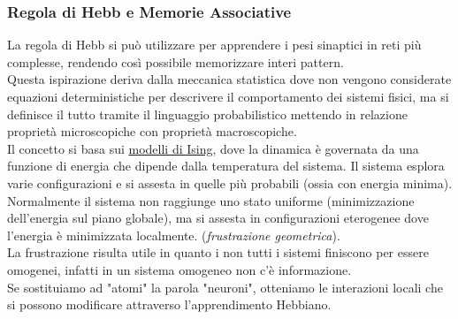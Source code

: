 \documentclass[12pt, a4paper]{article}
\begin{document}
\subsubsection{Regola di Hebb e Memorie Associative}
La regola di Hebb si può utilizzare per apprendere i pesi sinaptici in reti più complesse, rendendo così possibile memorizzare interi pattern. \\
Questa ispirazione deriva dalla meccanica statistica dove non vengono considerate equazioni deterministiche per descrivere il comportamento dei sistemi fisici, ma si definisce il tutto tramite il linguaggio probabilistico mettendo in relazione proprietà microscopiche con proprietà macroscopiche. \\
Il concetto si basa sui \href{https://it.wikipedia.org/wiki/Modello_di_Ising}{modelli di Ising}, dove la dinamica è governata da una funzione di energia che dipende dalla temperatura del sistema. Il sistema esplora varie configurazioni e si assesta in quelle più probabili (ossia con energia minima). Normalmente il sistema non raggiunge uno stato uniforme (minimizzazione dell'energia sul piano globale), ma si assesta in configurazioni eterogenee dove l'energia è minimizzata localmente. (\textit{frustrazione geometrica}). \\
La frustrazione risulta utile in quanto i non tutti i sistemi finiscono per essere omogenei, infatti in un sistema omogeneo non c'è informazione. \\
Se sostituiamo ad "atomi" la parola "neuroni", otteniamo le interazioni locali che si possono modificare attraverso l'apprendimento Hebbiano.
\end{document}
